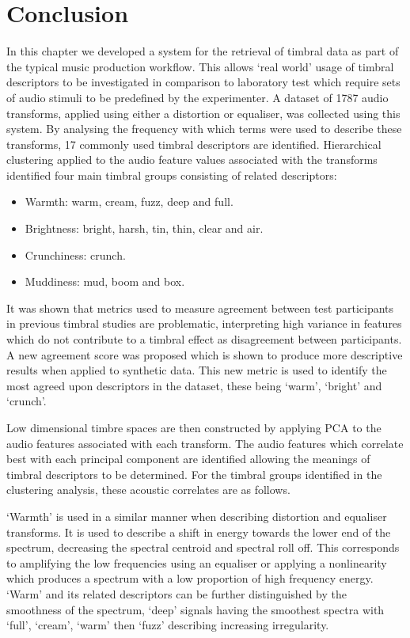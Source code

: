 \section{Conclusion}
	In this chapter we developed a system for the retrieval of timbral data as part of the typical music production
	workflow. This allows `real world' usage of timbral descriptors to be investigated in comparison to laboratory test
	which require sets of audio stimuli to be predefined by the experimenter. A dataset of 1787 audio transforms,
	applied using either a distortion or equaliser, was collected using this system. By analysing the frequency with
	which terms were used to describe these transforms, 17 commonly used timbral descriptors are identified.
	Hierarchical clustering applied to the audio feature values associated with the transforms identified four main
	timbral groups consisting of related descriptors:

	\begin{itemize}
		\item Warmth: warm, cream, fuzz, deep and full.
		\item Brightness: bright, harsh, tin, thin, clear and air.
		\item Crunchiness: crunch.
		\item Muddiness: mud, boom and box.
	\end{itemize}

	It was shown that metrics used to measure agreement between test participants in previous timbral studies are
	problematic, interpreting high variance in features which do not contribute to a timbral effect as disagreement
	between participants. A new agreement score was proposed which is shown to produce more descriptive results when
	applied to synthetic data. This new metric is used to identify the most agreed upon descriptors in the dataset,
	these being `warm', `bright' and `crunch'.

	Low dimensional timbre spaces are then constructed by applying PCA to the audio features associated with each
	transform. The audio features which correlate best with each principal component are identified allowing the
	meanings of timbral descriptors to be determined. For the timbral groups identified in the clustering analysis,
	these acoustic correlates are as follows.

	`Warmth' is used in a similar manner when describing distortion and equaliser transforms. It is used to describe a
	shift in energy towards the lower end of the spectrum, decreasing the spectral centroid and spectral roll off. This
	corresponds to amplifying the low frequencies using an equaliser or applying a nonlinearity which produces a
	spectrum with a low proportion of high frequency energy. `Warm' and its related descriptors can be further
	distinguished by the smoothness of the spectrum, `deep' signals having the smoothest spectra with `full', `cream',
	`warm' then `fuzz' describing increasing irregularity.

